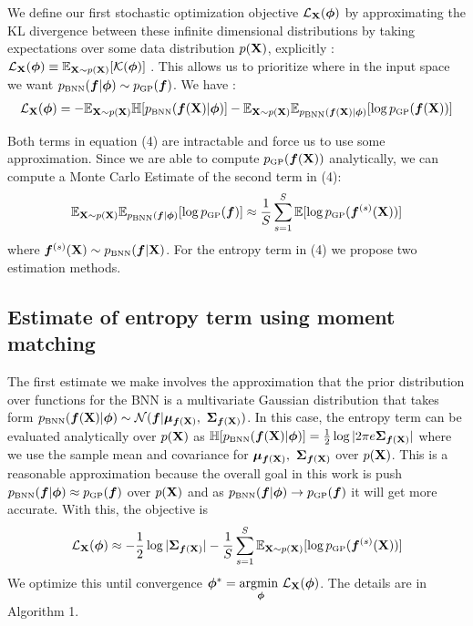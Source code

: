 \documentclass{article}
\begin{document}
We define our first stochastic optimization objective $\mathcal{L} _{ \mathbf{X} } (\bm \phi)$ 
by approximating the KL divergence between these infinite dimensional distributions 
by taking expectations over some data distribution $p( \mathbf{X} )$, explicitly : 
$ \mathcal{L} _{ \mathbf{X} } (\bm \phi) \equiv \mathbb{E} _{ \mathbf{X}  \sim p( \mathbf{X} )} [ \mathcal K (\bm \phi) ] $ . 
This allows us to prioritize where in the input space we want
 $\pbnn (\bm f |  \bm \phi ) \sim \pgp (\bm f  ) $. We have :
\begin{align}
\elbo _\X (\bm \phi)  = -\E _{\X \sim p(\X)} \entropy [\pbnn (\bm f (\X) |  \bm \phi ) ] 
	  			           - \E _{\X \sim p(\X)} \E_{\pbnn (\bm f (\X) |  \bm \phi ) } [\log \pgp (\bm f (\X) ) ]    
\end{align}

Both terms in equation (4) are intractable and force us to use some approximation. 
Since we are able to compute $\pgp (\bm f (\X))$ analytically, we can compute a Monte Carlo 
Estimate of the second term in (4):
\begin{align*}
	\E _{\X \sim p(\X)} \E_{\pbnn (\bm f |  \bm \phi ) } [\log \pgp (\bm f  ) ]  \approx  
  \frac{1}{S} \sum_{s=1}^S \E [\log \pgp (\bm f ^{(s)}(\X) ) ]
\end{align*}
where $\bm f ^{(s)}(\X) \sim \pbnn (\bm f | \X )$. 
For the entropy term in (4) we propose two estimation methods. 
\subsection{Estimate of entropy term using moment matching}

The first estimate we make involves the approximation that the prior distribution 
over functions for the BNN is a multivariate Gaussian distribution that takes form 
$\pbnn (\bm f (\X) |  \bm \phi ) \sim \N (\bm f | \bm \mu_{\bm f(\X) },\ \bm \Sigma _{\bm f(\X) } )$.  
In this case, the entropy term can be evaluated analytically over $p( \mathbf{X} ) $ as 
$\entropy [\pbnn (\bm f (\X) |  \bm \phi ) ] = \half \log |2\pi e \bm \Sigma _{\bm f(\X) }| $ 
where we use the sample mean and covariance for 
$\bm \mu _{\bm f( \mathbf{X} ) },\ \bm \Sigma _{\bm f( \mathbf{X} ) }$ over $p( \mathbf{X} ) $. 
This is a reasonable approximation because the overall goal in this work is push 
$\pbnn (\bm f |  \bm \phi ) \approx \pgp (\bm f  ) $ over $p( \mathbf{X} )$ 
and as $\pbnn (\bm f |  \bm \phi ) \to \pgp (\bm f  ) $ 
it will get more accurate. With this, the objective is  
\begin{align}
     \elbo _\X (\bm \phi) \approx
  -\half \log |\bm \Sigma _{\bm f(\X) }| -
  \frac{1}{S} \sum_{s=1}^S \E _{\X \sim p(\X)} [\log \pgp (\bm f ^{(s)}(\X) ) ]
\end{align}
We optimize this until convergence $ \bm \phi ^* =  \underset{\bm \phi}{\text{argmin }}  \mathcal{L} _{ \mathbf{X} } (\bm \phi ) $.
The details are in Algorithm 1. 
\end{document}
